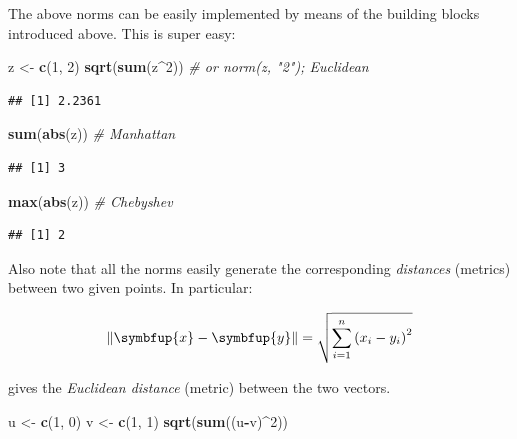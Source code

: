 \documentclass[10pt,b5paper,krantz1]{krantz}
\newenvironment{Shaded}{\begin{snugshade}}{\end{snugshade}}
\newcommand{\CommentTok}[1]{\textcolor[rgb]{0.37,0.37,0.37}{\textit{#1}}}
\newcommand{\DecValTok}[1]{\textcolor[rgb]{0.06,0.06,0.06}{#1}}
\newcommand{\KeywordTok}[1]{\textcolor[rgb]{0.27,0.27,0.27}{\textbf{#1}}}
\newcommand{\NormalTok}[1]{#1}
\newcommand{\OperatorTok}[1]{\textcolor[rgb]{0.43,0.43,0.43}{\textbf{#1}}}
\newcommand{\StringTok}[1]{\textcolor[rgb]{0.5,0.5,0.5}{#1}}
\renewcommand{\boldsymbol}[1]{\symbfup{#1}}
\begin{document}
The above norms can be easily implemented by means of the building blocks
introduced above. This is super easy:

\begin{Shaded}
\begin{Highlighting}[]
\NormalTok{z <-}\StringTok{ }\KeywordTok{c}\NormalTok{(}\DecValTok{1}\NormalTok{, }\DecValTok{2}\NormalTok{)}
\KeywordTok{sqrt}\NormalTok{(}\KeywordTok{sum}\NormalTok{(z}\OperatorTok{^}\DecValTok{2}\NormalTok{)) }\CommentTok{# or norm(z, "2"); Euclidean}
\end{Highlighting}
\end{Shaded}

\begin{verbatim}
## [1] 2.2361
\end{verbatim}

\begin{Shaded}
\begin{Highlighting}[]
\KeywordTok{sum}\NormalTok{(}\KeywordTok{abs}\NormalTok{(z))    }\CommentTok{# Manhattan}
\end{Highlighting}
\end{Shaded}

\begin{verbatim}
## [1] 3
\end{verbatim}

\begin{Shaded}
\begin{Highlighting}[]
\KeywordTok{max}\NormalTok{(}\KeywordTok{abs}\NormalTok{(z))    }\CommentTok{# Chebyshev}
\end{Highlighting}
\end{Shaded}

\begin{verbatim}
## [1] 2
\end{verbatim}

Also note that all the norms easily generate the corresponding
\emph{distances} (metrics) between two given points. In particular:

\[
\| \boldsymbol{x}-\boldsymbol{y} \| = \sqrt{
\sum_{i=1}^n \left(x_i-y_i\right)^2
}
\]

gives the \emph{Euclidean distance} (metric) between the two vectors.

\begin{Shaded}
\begin{Highlighting}[]
\NormalTok{u <-}\StringTok{ }\KeywordTok{c}\NormalTok{(}\DecValTok{1}\NormalTok{, }\DecValTok{0}\NormalTok{)}
\NormalTok{v <-}\StringTok{ }\KeywordTok{c}\NormalTok{(}\DecValTok{1}\NormalTok{, }\DecValTok{1}\NormalTok{)}
\KeywordTok{sqrt}\NormalTok{(}\KeywordTok{sum}\NormalTok{((u}\OperatorTok{-}\NormalTok{v)}\OperatorTok{^}\DecValTok{2}\NormalTok{))}
\end{Highlighting}
\end{Shaded}
\end{document}

